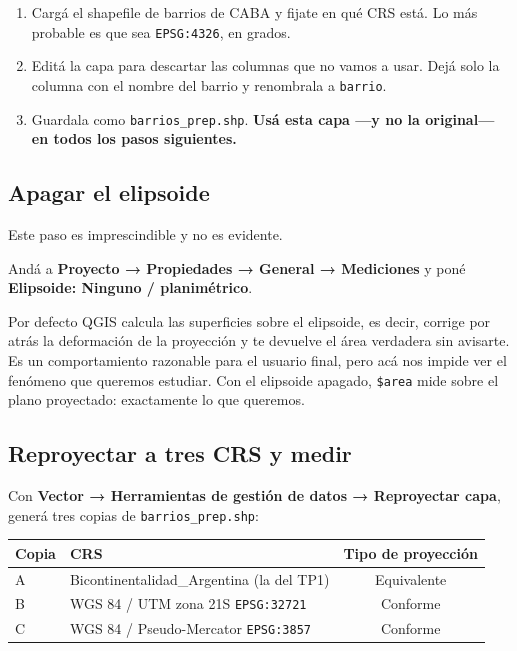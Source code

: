 \documentclass{article}
\begin{document}
\begin{enumerate}
    \item Cargá el shapefile de barrios de CABA y fijate en qué CRS está. Lo más probable es que sea \texttt{EPSG:4326}, en grados.
    \item Editá la capa para descartar las columnas que no vamos a usar. Dejá solo la columna con el nombre del barrio y renombrala a \texttt{barrio}.
    \item Guardala como \texttt{barrios\_prep.shp}. \textbf{Usá esta capa —y no la original— en todos los pasos siguientes.}
\end{enumerate}

\subsection{Apagar el elipsoide}

Este paso es imprescindible y no es evidente.

Andá a \textbf{Proyecto → Propiedades → General → Mediciones} y poné \textbf{Elipsoide: Ninguno / planimétrico}.

Por defecto QGIS calcula las superficies sobre el elipsoide, es decir, corrige por atrás la deformación de la proyección y te devuelve el área verdadera sin avisarte. Es un comportamiento razonable para el usuario final, pero acá nos impide ver el fenómeno que queremos estudiar. Con el elipsoide apagado, \texttt{\$area} mide sobre el plano proyectado: exactamente lo que queremos.

\subsection{Reproyectar a tres CRS y medir}

Con \textbf{Vector → Herramientas de gestión de datos → Reproyectar capa}, generá tres copias de \texttt{barrios\_prep.shp}:

\begin{center}
\begin{tabular}{llc}
    \toprule
    Copia & CRS & Tipo de proyección \\
    \midrule
    A & Bicontinentalidad\_Argentina (la del TP1) & Equivalente \\
    B & WGS 84 / UTM zona 21S \quad \texttt{EPSG:32721} & Conforme \\
    C & WGS 84 / Pseudo-Mercator \quad \texttt{EPSG:3857} & Conforme \\
    \bottomrule
\end{tabular}
\end{center}
\end{document}
